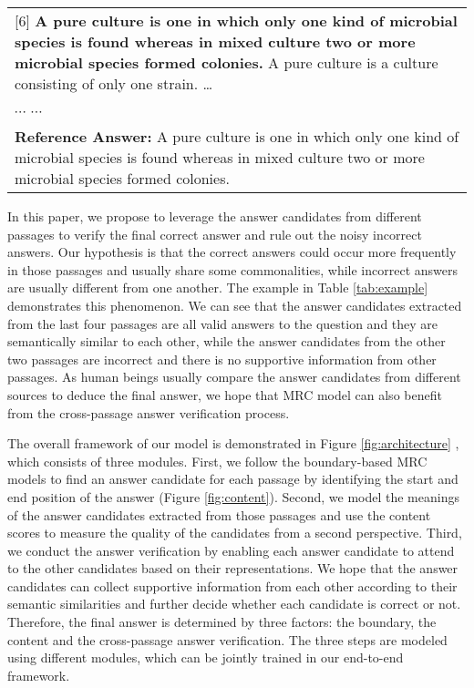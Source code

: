 \documentclass[11pt,a4paper]{article}
\newcommand{\figref}[1]{Figure \ref{#1}}
\newcommand{\tabref}[1]{Table \ref{#1}}
\begin{document}
\begin{table*}[htbp]
\begin{tabular}{p{\textwidth}}
[6] \textbf{A pure culture is one in which only one kind of microbial species is found whereas in mixed culture two or more microbial species formed colonies.} A pure culture is a culture consisting of only one strain. \ldots \\

$\cdots$ $\cdots$ \\
\hline
\textbf{Reference Answer:} A pure culture is one in which only one kind of microbial species is found whereas in mixed culture two or more microbial species formed colonies. \\
\hline
\end{tabular}
\caption{An example from MS-MARCO. The text in bold is the predicted answer candidate from each passage according to the boundary model. The candidate from [1] is chosen as the final answer by this model, while the correct answer is from [6] and can be verified by the answers from [3], [4], [5]. } \label{tab:example}
\end{table*}






In this paper, we propose to leverage the answer candidates from different passages to verify the final correct answer and rule out the noisy incorrect answers. 
Our hypothesis is that the correct answers could occur more frequently in those passages and usually share some commonalities, while incorrect answers are usually different from one another. The example in \tabref{tab:example} demonstrates this phenomenon. We can see that the answer candidates extracted from the last four passages are all valid answers to the question and they are semantically similar to each other, while the answer candidates from the other two passages are incorrect and there is no supportive information from other passages. As human beings usually compare the answer candidates from different sources to deduce the final answer, we hope that MRC model can also benefit from the cross-passage answer verification process.



The overall framework of our model is demonstrated in \figref{fig:architecture} , which consists of three modules. First, we follow the boundary-based MRC models \cite{bidaf,match-lstm} to find an answer candidate for each passage by identifying the start and end position of the answer (\figref{fig:content}). Second, we model the meanings of the answer candidates extracted from those passages and use the content scores to measure the quality of the candidates from a second perspective. Third, we conduct the answer verification by enabling each answer candidate to attend to the other candidates based on their representations. We hope that the answer candidates can collect supportive information from each other according to their semantic similarities and further decide whether each candidate is correct or not. Therefore, the final answer is determined by three factors: the boundary, the content and the cross-passage answer verification. The three steps are modeled using different modules, which can be jointly trained in our end-to-end framework. 
\end{document}
